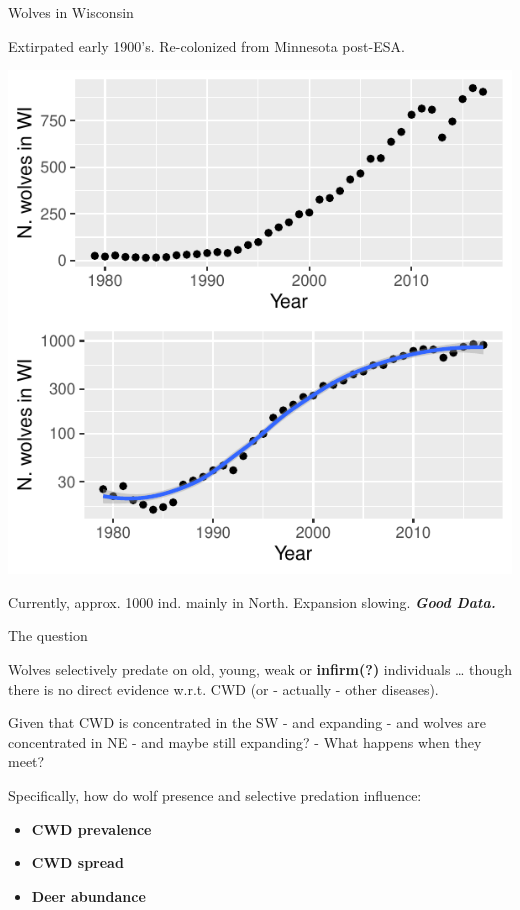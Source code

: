\documentclass[
  11pt,
  ignorenonframetext,
  aspectratio=43]{beamer}
\providecommand{\tightlist}{%
  \setlength{\itemsep}{0pt}\setlength{\parskip}{0pt}}
\begin{document}
\begin{frame}{Wolves in Wisconsin}
\protect\hypertarget{wolves-in-wisconsin}{}
\small

Extirpated early 1900's. Re-colonized from Minnesota post-ESA.

\bcol

\col


\col

\includegraphics{deer_wolf_CWD_files/figure-beamer/WolfNums-1.pdf}

\ecol

Currently, approx. 1000 ind. mainly in North. Expansion slowing.
\textbf{\emph{Good Data.}}
\end{frame}

\begin{frame}{The question}
\protect\hypertarget{the-question}{}
\small

Wolves selectively predate on old, young, weak or \textbf{infirm(?)}
individuals \ldots{} though there is no direct evidence w.r.t. CWD (or -
actually - other diseases).

Given that CWD is concentrated in the SW - and expanding - and wolves
are concentrated in NE - and maybe still expanding? - What happens when
they meet?

Specifically, how do wolf presence and selective predation influence:

\begin{itemize}
\tightlist
\item
  \textbf{CWD prevalence}
\item
  \textbf{CWD spread}
\item
  \textbf{Deer abundance}
\end{itemize}
\end{frame}
\end{document}
